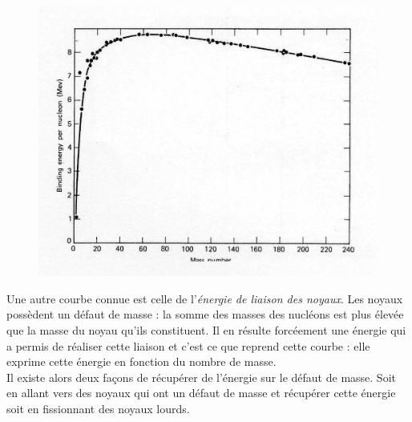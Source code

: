 	\begin{figure}
	\vspace{-8mm}
	\includegraphics[scale=0.1]{ch1/image2.png}
	\end{figure}
Une autre courbe connue est celle de l'\textit{énergie de liaison des noyaux}. Les noyaux 
possèdent un défaut de masse : la somme des masses des nucléons est plus élevée que la 
masse du noyau qu'ils constituent. Il en résulte forcéement une énergie qui a permis de 
réaliser cette liaison et c'est ce que reprend cette courbe : elle exprime cette énergie 
en fonction du nombre de masse.\\

Il existe alors deux façons de récupérer de l'énergie sur le défaut de masse. Soit en allant 
vers des noyaux qui ont un défaut de masse et récupérer cette énergie soit en fissionnant 
des noyaux lourds. 

